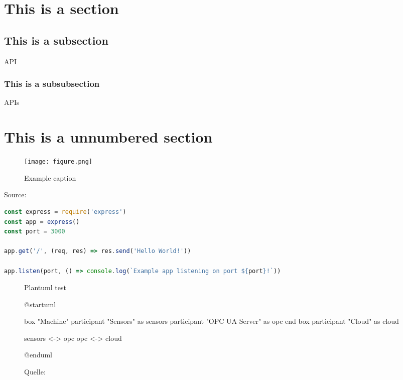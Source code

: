 
\section{This is a section}
\blindtext {}
\subsection{This is a subsection}
\blindtext \ac{API}
\subsubsection{This is a subsubsection}
\blindtext \acp{API}
\section*{This is a unnumbered section}

\begin{figure}[ht] 
    \centering
    \caption{Example caption}
    \texttt{[image: figure.png]} 
    \label{fig:goodreference}
\end{figure}

\blindtext

\begin{subcaptionenv}{Source: }
    \begin{lstlisting}[caption={Express Example}, language=javascript]
const express = require('express')
const app = express()
const port = 3000

app.get('/', (req, res) => res.send('Hello World!'))

app.listen(port, () => console.log(`Example app listening on port ${port}!`))
    \end{lstlisting}
\end{subcaptionenv}

\blindtext

\begin{figure}[h]
    \centering
    \caption{Plantuml test}
    \begin{plantuml}
        @startuml

        box "Machine"
            participant "Sensors" as sensors
            participant "OPC UA Server" as opc
        end box
        participant "Cloud" as cloud

        sensors <-> opc
        opc <-> cloud

        @enduml    
    \end{plantuml}
    \caption*{\footnotesize{Quelle: }}
    \label{fig:plantuml_test}
\end{figure}


